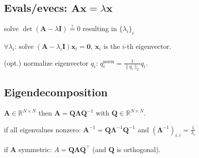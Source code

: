 \documentclass[a4paper, 11pt, landscape]{article}
\begin{document}
\begin{multicols*}{3}

\subsection{Evals/evecs: $\mathbf{Ax} = \lambda \mathbf{x}$}
\begin{compactenum}
	\item solve $\operatorname{det}(\mathbf{A} - \lambda \mathbf{I}) \overset{!}{=} 0$ resulting in $\{\lambda_i\}_i$
	\item $\forall \lambda_i$:
		solve $(\mathbf{A} - \lambda_i \mathbf{I}) \mathbf{x}_i = \mathbf{0}$, $\mathbf{x}_i$ is the $i$-th eigenvector.
	\item (opt.) normalize eigenvector $q_i$: $q_i^{\text{norm}} = \frac{1}{\|q_i\|_2} q_i$.
\end{compactenum}

\subsection{Eigendecomposition}
\begin{inparaitem}[\color{red}\textbullet]
  \item $\mathbf{A} \in \mathbb{R}^{N \times N}$ then $\mathbf{A} = \mathbf{Q} \boldsymbol{\Lambda} \mathbf{Q}^{-1}$ with $\mathbf{Q} \in \mathbb{R}^{N \times N}$.
  \item if all eigenvalues nonzero: $\mathbf{A}^{-1} = \mathbf{Q} \boldsymbol{\Lambda}^{-1} \mathbf{Q}^{-1}$ and $(\boldsymbol{\Lambda}^{-1})_{i,i} = \frac{1}{\lambda_i}$
  \item if $\mathbf{A}$ symmetric: $A = \mathbf{Q} \boldsymbol{\Lambda} \mathbf{Q^\top}$ (and $\mathbf{Q}$ is orthogonal).
\end{inparaitem}


\end{multicols*}
\end{document}
